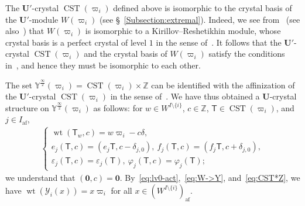\documentclass[ALCO,ThmDefs,Unicode,epreuves]{cedram}
\newcommand{\BZ}{\mathbb{Z}}
\newcommand\bm[1]{\boldsymbol{#1}}
\renewcommand{\U}{\mathbf{U}}
\newcommand{\si}{\frac{\infty}{2}}
\DeclareMathOperator{\af}{af}
\DeclareMathOperator{\wt}{wt}
\DeclareMathOperator{\CST}{CST}
\begin{document}
\begin{rema} \label{rem:KR}
The 
$\U'$-crystal 
$\CST (\varpi_i)$ 
defined above is isomorphic to the crystal basis of the $\U'$-module 
$W(\varpi_i)$ (see \S~\ref{Subsection:extremal}).
Indeed, we see from~\cite[Theorem~5.17~(ix)]{K02}
(see also~\cite[Remark~3.3]{N}) 
that 
$W(\varpi_i)$ 
is isomorphic to a Kirillov--Reshetikhin module, 
whose crystal basis is a perfect crystal of level $1$ 
in the sense of~\cite[Definition~1.1.1]{KMN}. 
It follows that the $\U'$-crystal 
$\CST (\varpi_i)$ 
and the crystal basis of 
$W(\varpi_i)$ 
satisfy the conditions in~\cite[Proposition~1.2.1 for $l = 1$]{KMN}, 
and hence they must be isomorphic to each other.
\end{rema}

The set 
$\mathbb{Y}^{\si}(\varpi_i) = \CST (\varpi_i) \times \BZ$ 
can be identified with the affinization of the $\U'$-crystal 
$\CST (\varpi_i)$
in the sense of~\cite[\S~4.2]{K02}. 
We have thus obtained a $\U$-crystal structure on 
$\mathbb{Y}^{\si}(\varpi_i)$
as follows: 
for 
$w \in W^{I \setminus \{ i \}}$, 
$c \in \BZ$, 
$\mathsf{T} \in \CST (\varpi_i)$, 
and 
$j \in I_{\af}$, 
\begin{align} \label{eq:CST*Z}
\begin{cases}
\wt (\mathsf{T}_w,c) = w\varpi_i - c\delta , \\%
e_j (\mathsf{T},c) = (e_j \mathsf{T} , c - \delta_{j,0}), \ 
f_j (\mathsf{T},c) = (f_j \mathsf{T} , c + \delta_{j,0}), \\%
\varepsilon_j(\mathsf{T},c) = \varepsilon_j(\mathsf{T}), \ 
\varphi_j(\mathsf{T},c) = \varphi_j(\mathsf{T}) ;
\end{cases}
\end{align}
we understand that 
$(\bm{0},c) = \bm{0}$. 
By~\eqref{eq:lv0-act},~\eqref{eq:W->Y}, and~\eqref{eq:CST*Z}, 
we have 
$\wt (\mathcal{Y}_i(x)) = x\varpi_i$ 
for all 
$x \in (W^{I \setminus \{ i \}})_{\af}$.
\end{document}
